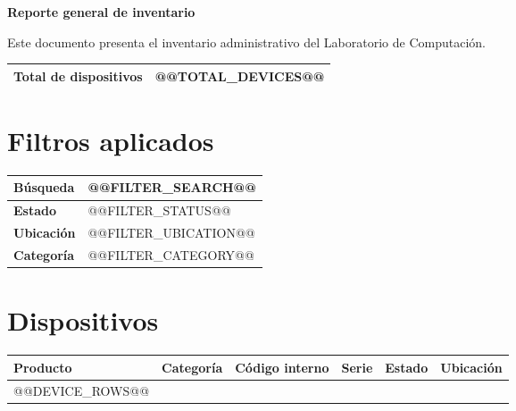\documentclass[letterpaper,11pt]{article}
\begin{document}
\begin{center}
    \LARGE\textbf{Reporte general de inventario}
\end{center}

\vspace{0.3cm}

Este documento presenta el inventario administrativo del Laboratorio de Computación.

\vspace{0.4cm}

\begin{tabular}{|p{}|p{}|}
    \hline
    \textbf{Total de dispositivos} & @@TOTAL_DEVICES@@ \\ \hline
\end{tabular}

\vspace{0.5cm}

\section*{Filtros aplicados}

\begin{tabular}{|p{}|p{}|}
    \hline
    \textbf{Búsqueda} & @@FILTER_SEARCH@@ \\ \hline
    \textbf{Estado} & @@FILTER_STATUS@@ \\ \hline
    \textbf{Ubicación} & @@FILTER_UBICATION@@ \\ \hline
    \textbf{Categoría} & @@FILTER_CATEGORY@@ \\ \hline
\end{tabular}

\vspace{0.5cm}

\section*{Dispositivos}

{\small
\setlength{\tabcolsep}{3pt}
\renewcommand{\arraystretch}{1.15}
\begin{longtable}{|p{}|p{}|p{}|p{}|p{}|p{}|}
    \hline
    \rowcolor[HTML]{cccccc}
    \textbf{Producto} &
    \textbf{Categoría} &
    \textbf{Código interno} &
    \textbf{Serie} &
    \textbf{Estado} &
    \textbf{Ubicación} \\
    \hline
    @@DEVICE_ROWS@@
\end{longtable}
}
\end{document}
